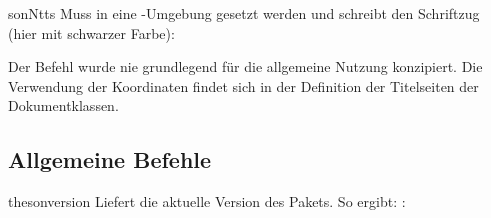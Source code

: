 \documentclass{sopra-base}
\begin{document}
\begin{command}{sonNtts}{}
    Muss in eine -Umgebung gesetzt werden und schreibt den Schriftzug (hier mit schwarzer Farbe):
    \begin{center}
    \end{center}
    Der Befehl wurde nie grundlegend für die allgemeine Nutzung konzipiert. Die Verwendung der Koordinaten findet sich in der Definition der Titelseiten der Dokumentklassen.
\end{command}

\subsection{Allgemeine Befehle}
\begin{command}{thesonversion}{}
    Liefert die aktuelle Version des Pakets. So ergibt: : \thesonversion\\
\end{command}
\end{document}
